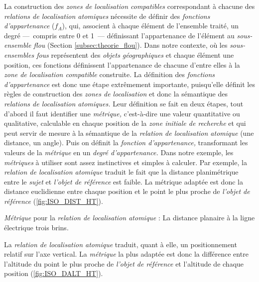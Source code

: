 La construction des \emph{zones de localisation compatibles}
correspondant à chacune des \emph{relations de localisation atomiques}
nécessite de définir des \emph{fonctions d'appartenance} ($f_A$), qui,
associent à chaque élément de l'ensemble traité, un degré ---~compris
entre 0 et 1~--- définissant l'appartenance de l'élément au
\emph{sous-ensemble flou} (Section \ref{subsec:theorie_flou}). Dans
notre contexte, où les \emph{sous-ensembles fous} représentent des
\emph{objets géographiques} et chaque élément une position, ces
fonctions définissent l'appartenance de chacune d'entre elles à la
\emph{zone de localisation compatible} construite. La définition des
\emph{fonctions d'appartenance} est donc une étape extrêmement
importante, puisqu'elle définit les règles de construction des
\emph{zones de localisation} et donc la sémantique des \emph{relations
  de localisation atomiques.} Leur définition se fait en deux étapes,
tout d'abord il faut identifier une \emph{métrique,} c'est-à-dire une
valeur quantitative ou qualitative, calculable en chaque position de
la \emph{zone initiale de recherche} et qui peut servir de mesure à la
sémantique de la \emph{relation de localisation atomique} (\eg une
distance, un angle). Puis on définit la \emph{fonction
  d'appartenance,} transformant les valeurs de la \emph{métrique} en
un \emph{degré d'appartenance.} Dans notre exemple, les
\emph{métriques} à utiliser sont assez instinctives et simples à
calculer. Par exemple, la \emph{relation de localisation atomique}
traduit le fait que la distance planimétrique entre le \emph{sujet} et
\emph{l'objet de référence} est faible. La métrique adaptée est donc
la distance euclidienne entre chaque position et le point le plus
proche de \emph{l'objet de référence} (\autoref{fig:ISO_DIST_HT}).

\begin{carte}
  \centering
  
  \caption{\emph{Métrique} pour la \emph{relation de localisation
      atomique}    \protect{}
    : La distance planaire à la ligne électrique trois brins.}
  \label{fig:ISO_DIST_HT}
\end{carte}

La \emph{relation de localisation atomique}
 traduit,
quant à elle, un positionnement relatif sur l'axe vertical. La
\emph{métrique} la plus adaptée est donc la différence entre
l'altitude du point le plus proche de \emph{l'objet de référence} et
l'altitude de chaque position (\autoref{fig:ISO_DALT_HT}).

